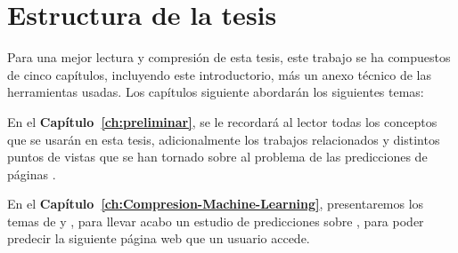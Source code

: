 %
%
\uncm
\section{Estructura de la tesis} 




Para una mejor lectura y compresión de esta tesis, este trabajo se ha compuestos de cinco capítulos, incluyendo este introductorio, más un anexo técnico de las herramientas usadas. Los capítulos siguiente abordarán los siguientes temas:

 
En el \textbf{Capítulo~\ref{ch:preliminar}}, se le recordará al lector todas los conceptos que se usarán en esta tesis, adicionalmente los trabajos relacionados y distintos puntos de vistas que se han tornado sobre al problema de las predicciones de páginas \web.


En el \textbf{Capítulo~\ref{ch:Compresion-Machine-Learning}}, presentaremos los temas de \machinelearning y \losslessdatacompression, para llevar acabo un estudio de predicciones sobre \webasccesslog, para poder predecir la siguiente página web que un usuario accede.



